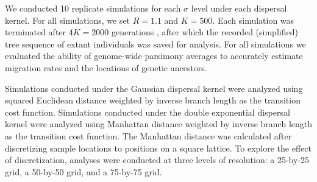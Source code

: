 We conducted 10 replicate simulations for each $\sigma$ level under each 
dispersal kernel. For all simulations, we set $R=1.1$ and $K=500$. Each
simulation was terminated after $4K = 2000$ generations , after which the
recorded (simplified) tree sequence of extant individuals was saved for 
analysis. For all simulations we evaluated the ability of genome-wide parsimony
averages to accurately estimate migration rates and the locations of genetic 
ancestors.

Simulations conducted under the Gaussian dispersal kernel were analyzed using
squared Euclidean distance weighted by inverse branch length as the transition
cost function. Simulations conducted under the double exponential dispersal
kernel were analyzed using Manhattan distance weighted by inverse branch length
as the transition cost function. The Manhattan distance was calculated after 
discretizing sample locations to positions on a square lattice. To explore the
effect of discretization, analyses were conducted at three levels of resolution: 
a 25-by-25 grid, a 50-by-50 grid, and a 75-by-75 grid.


